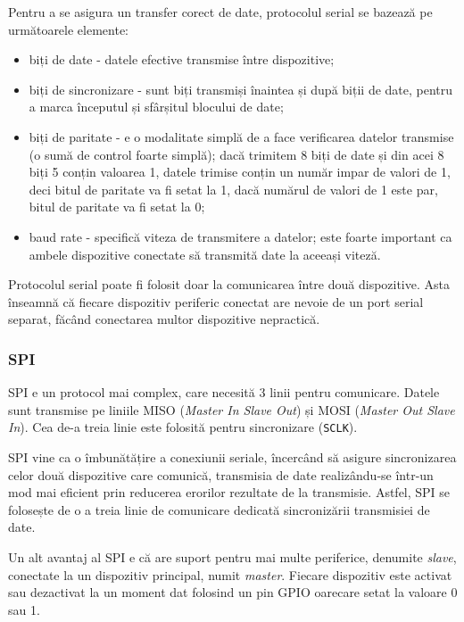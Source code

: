 Pentru a se asigura un transfer corect de date, protocolul serial se bazează pe
următoarele elemente:

\begin{itemize}
	\item biți de date - datele efective transmise între dispozitive;
	\item biți de sincronizare - sunt biți transmiși înaintea și după biții
		de date, pentru a marca începutul și sfârșitul blocului de date;
	\item biți de paritate - e o modalitate simplă de a face verificarea
		datelor transmise (o sumă de control foarte simplă); dacă trimitem 8
		biți de date și din acei 8 biți 5 conțin valoarea 1, datele
		trimise conțin un număr impar de valori de 1, deci bitul de
		paritate va fi setat la 1, dacă numărul de valori de 1 este par,
		bitul de paritate va fi setat la 0;
	\item baud rate - specifică viteza de transmitere a datelor; este foarte
		important ca ambele dispozitive conectate să transmită date la
		aceeași viteză.
\end{itemize}

Protocolul serial poate fi folosit doar la comunicarea între două dispozitive.
Asta înseamnă că fiecare dispozitiv periferic conectat are nevoie de un port
serial separat, făcând conectarea multor dispozitive nepractică.

\subsubsection{SPI}
\label{sec:embed:bus:wired:spi}

SPI e un protocol mai complex, care necesită 3 linii pentru comunicare. Datele
sunt transmise pe liniile MISO (\textit{Master In
Slave Out}) și MOSI  (\textit{Master Out Slave In}). Cea
de-a treia linie este folosită pentru sincronizare (\texttt{SCLK}).

SPI vine ca o îmbunătățire a conexiunii seriale, încercând să asigure
sincronizarea celor două dispozitive care comunică, transmisia de date
realizându-se într-un mod mai eficient prin reducerea erorilor rezultate de la
transmisie. Astfel, SPI se folosește de o a treia linie de comunicare dedicată
sincronizării transmisiei de date.

Un alt avantaj al SPI e că are suport pentru mai multe periferice, denumite \textit{slave},
conectate la un dispozitiv principal, numit \textit{master}. Fiecare dispozitiv este
activat sau dezactivat la un moment dat folosind un pin GPIO oarecare setat la
valoare 0 sau 1.

